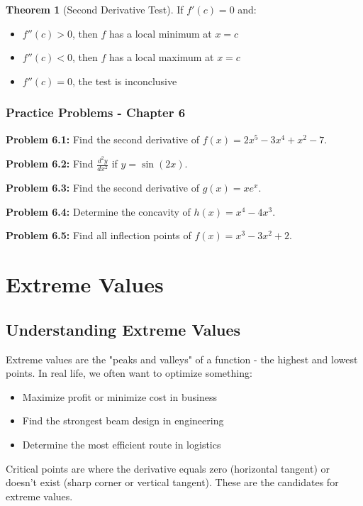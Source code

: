 \documentclass[12pt,a4paper]{book}
\theoremstyle{definition}
\newtheorem{theorem}{Theorem}[chapter]
\begin{document}
\begin{theorem}[Second Derivative Test]
If $f'(c) = 0$ and:
\begin{itemize}
    \item $f''(c) > 0$, then $f$ has a local minimum at $x = c$
    \item $f''(c) < 0$, then $f$ has a local maximum at $x = c$
    \item $f''(c) = 0$, the test is inconclusive
\end{itemize}
\end{theorem}

\subsection{Practice Problems - Chapter 6}

\textbf{Problem 6.1:} Find the second derivative of $f(x) = 2x^5 - 3x^4 + x^2 - 7$.

\textbf{Problem 6.2:} Find $\frac{d^2y}{dx^2}$ if $y = \sin(2x)$.

\textbf{Problem 6.3:} Find the second derivative of $g(x) = xe^x$.

\textbf{Problem 6.4:} Determine the concavity of $h(x) = x^4 - 4x^3$.

\textbf{Problem 6.5:} Find all inflection points of $f(x) = x^3 - 3x^2 + 2$.

\chapter{Extreme Values}

\section{Understanding Extreme Values}

\begin{intuition}
Extreme values are the "peaks and valleys" of a function - the highest and lowest points. In real life, we often want to optimize something:
\begin{itemize}
    \item Maximize profit or minimize cost in business
    \item Find the strongest beam design in engineering
    \item Determine the most efficient route in logistics
\end{itemize}

Critical points are where the derivative equals zero (horizontal tangent) or doesn't exist (sharp corner or vertical tangent). These are the candidates for extreme values.
\end{intuition}
\end{document}

